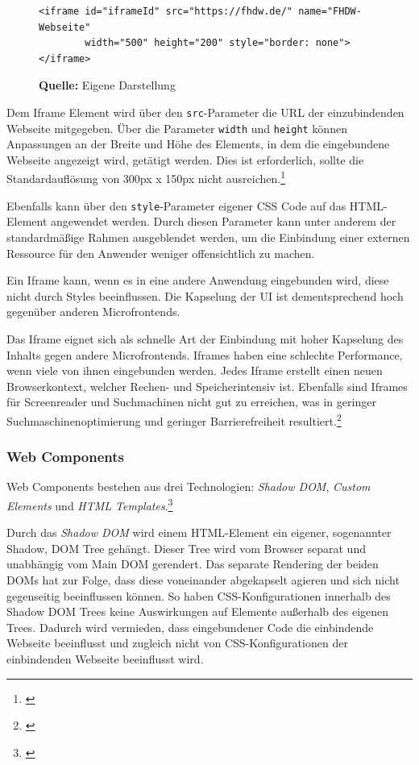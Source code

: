 \begin{figure}[bht]
	\begin{lstlisting}[caption=Exemplarische Einbindung einer Webseite über das Iframe-Element, label=list:iframe]
		<iframe id="iframeId" src="https://fhdw.de/" name="FHDW-Webseite" 
		width="500" height="200" style="border: none"></iframe>
	\end{lstlisting}
	\footnoterule{}
	\footnotesize{\textbf{Quelle:} Eigene Darstellung}
\end{figure}

Dem Iframe Element wird über den \texttt{src}-Parameter die \gls{URL} der einzubindenden Webseite mitgegeben. Über die Parameter \texttt{width} und \texttt{height} können Anpassungen an der Breite und Höhe des Elements, in dem die eingebundene Webseite angezeigt wird, getätigt werden. Dies ist erforderlich, sollte die Standardauflösung von 300px x 150px nicht ausreichen.\footnote{\cite[vgl.][]{MDNWebDocs2021a}}

Ebenfalls kann über den \texttt{style}-Parameter eigener \gls{CSS} Code auf das \gls{HTML}-Element angewendet werden. Durch diesen Parameter kann unter anderem der standardmäßige Rahmen ausgeblendet werden, um die Einbindung einer externen Ressource für den Anwender weniger offensichtlich zu machen.

Ein Iframe kann, wenn es in eine andere Anwendung eingebunden wird, diese nicht durch Styles beeinflussen. Die Kapselung der UI ist dementsprechend hoch gegenüber anderen Microfrontends.

Das Iframe eignet sich als schnelle Art der Einbindung mit hoher Kapselung des Inhalts gegen andere Microfrontends. Iframes haben eine schlechte Performance, wenn viele von ihnen eingebunden werden. Jedes Iframe erstellt einen neuen Browserkontext, welcher Rechen- und Speicherintensiv ist. Ebenfalls sind Iframes für Screenreader und Suchmachinen nicht gut zu erreichen, was in geringer Suchmaschinenoptimierung und geringer Barrierefreiheit resultiert.\footnote{\cite[vgl.][35]{Geers2020}}

\subsubsection{Web Components}\label{sec:Webcomponents}

Web Components bestehen aus drei Technologien: \textit{Shadow DOM}, \textit{Custom Elements} und \textit{HTML Templates}.\footnote{\cite[vgl.][]{MDNWebDocs2022a}}

Durch das \textit{Shadow \gls{DOM}} wird einem \gls{HTML}-Element ein eigener, sogenannter Shadow, \gls{DOM} Tree gehängt. Dieser Tree wird vom Browser separat und unabhängig vom Main \gls{DOM} gerendert. Das separate Rendering der beiden \gls{DOM}s hat zur Folge, dass diese voneinander abgekapselt agieren und sich nicht gegenseitig beeinflussen können. So haben \gls{CSS}-Konfigurationen innerhalb des Shadow \gls{DOM} Trees keine Auswirkungen auf Elemente außerhalb des eigenen Trees. Dadurch wird vermieden, dass eingebundener Code die einbindende Webseite beeinflusst und zugleich nicht von \gls{CSS}-Konfigurationen der einbindenden Webseite beeinflusst wird.

